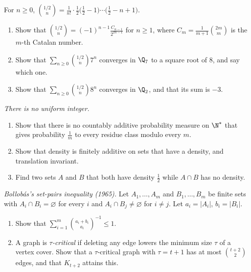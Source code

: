 \begin{exercise}[$\star\star$]\label{pb:whichroot}
For $n\ge0$, $\binom{1/2}n=\frac1{n!}\cdot\frac12\bigl(\frac12-1\bigr)\cdots\bigl(\frac12-n+1\bigr)$.
\begin{enumerate}[label=(\alph*)]
\item Show that $\binom{1/2}n=(-1)^{n-1}\frac{C_{n-1}}{2^{2n-1}}$ for $n\ge1$, where $C_m=\frac1{m+1}\binom{2m}m$ is the $m$-th
Catalan number.
\item Show that $\sum_{n\ge0}\binom{1/2}n7^n$ converges in $\Q_7$ to a square root of $8$, and say which one.
\item Show that $\sum_{n\ge0}\binom{1/2}n8^n$ converges in $\Q_2$, and that its sum is $-3$.
\end{enumerate}
\end{exercise}

\begin{exercise}[$\star$]\label{pb:nouniform}
\emph{There is no uniform integer.}
\begin{enumerate}[label=(\alph*)]
\item Show that there is no countably additive probability measure on $\N^*$ that gives probability $\frac1m$ to every residue
class modulo every $m$.
\item Show that density is finitely additive on sets that have a density, and translation invariant.
\item Find two sets $A$ and $B$ that both have density $\frac12$ while $A\cap B$ has no density.
\end{enumerate}
\end{exercise}

\begin{exercise}[$\star\star$]\label{pb:bollobas}
\emph{Bollobás's set-pairs inequality (1965).} Let $A_1,\dots,A_m$ and $B_1,\dots,B_m$ be finite sets with $A_i\cap B_i=\varnothing$ for every
$i$ and $A_i\cap B_j\ne\varnothing$ for $i\ne j$. Let $a_i=|A_i|$, $b_i=|B_i|$.
\begin{enumerate}[label=(\alph*)]
\item Show that $\displaystyle\sum_{i=1}^m\binom{a_i+b_i}{a_i}^{-1}\le1$.
\item A graph is \emph{$\tau$-critical} if deleting any edge lowers the minimum size $\tau$ of a vertex cover. Show that a $\tau$-critical
graph with $\tau=t+1$ has at most $\binom{t+2}2$ edges, and that $K_{t+2}$ attains this.
\end{enumerate}
\end{exercise}

